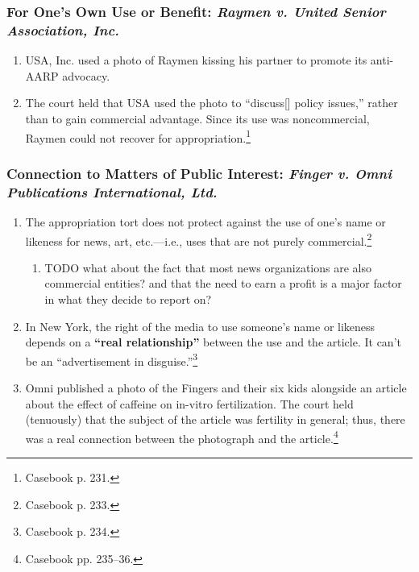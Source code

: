\subsubsection{For One's Own Use or Benefit: \emph{Raymen v. United Senior 
Association, Inc.}}

\begin{enumerate}
    \item USA, Inc. used a photo of Raymen kissing his partner to promote its 
    anti-AARP advocacy.
    \item The court held that USA used the photo to ``discuss[] policy issues,'' 
    rather than to gain commercial advantage. Since its use was noncommercial, 
    Raymen could not recover for appropriation.\footnote{Casebook p. 231.}
\end{enumerate}

\subsubsection{Connection to Matters of Public Interest: \emph{Finger v. Omni 
Publications International, Ltd.}}

\begin{enumerate}
    \item The appropriation tort does not protect against the use of one's name 
    or likeness for news, art, etc.---i.e., uses that are not purely 
    commercial.\footnote{Casebook p. 233.}
    \begin{enumerate}
        \item TODO what about the fact that most news organizations are also 
        commercial entities? and that the need to earn a profit is a major 
        factor in what they decide to report on?
    \end{enumerate}
    \item In New York, the right of the media to use someone's name or likeness 
    depends on a \textbf{``real relationship''} between the use and the article. 
    It can't be an ``advertisement in disguise.''\footnote{Casebook p. 234.}
    \item Omni published a photo of the Fingers and their six kids alongside an 
    article about the effect of caffeine on in-vitro fertilization. The court 
    held (tenuously) that the subject of the article was fertility in general; 
    thus, there was a real connection between the photograph and the 
    article.\footnote{Casebook pp. 235--36.}
\end{enumerate}

